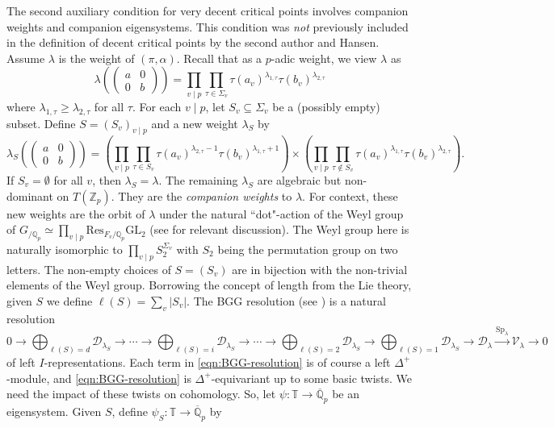 \documentclass[10pt, twoside]{amsart}
\theoremstyle{plain}
\theoremstyle{definition}
\theoremstyle{remark}
\numberwithin{equation}{subsection}
\def\Q{\mathbb Q}
\def\Z{\mathbb Z}
\def\T{\mathbb{T}}
\def\GL{\mathrm{GL}}
\def\Sp{\mathrm{Sp}}
\def\scrd{\mathscr D}
\def\scrv{\mathscr V}
\def\qpbar{\overline{\mathbb Q}_p}
\newcommand{\mat}[4]{\begin{pmatrix}#1&#2\\#3&#4\end{pmatrix}}
\begin{document}
The second auxiliary condition for very decent critical points involves companion weights and companion eigensystems. This condition was {\em not} previously included in the definition of decent { critical points} by the second author and Hansen. Assume $\lambda$ is the weight of $(\pi,\alpha)$. Recall that as a $p$-adic weight, we view $\lambda$ as
$$
\lambda\left(\mat a00b\right) = \prod_{v \mid p} \prod_{\tau \in \Sigma_v} \tau(a_v)^{\lambda_{1,\tau}}\tau(b_v)^{\lambda_{2,\tau}}
$$
where $\lambda_{1,\tau} \geq \lambda_{2,\tau}$ for all $\tau$. For each $v \mid p$, let $S_v \subseteq \Sigma_v$ be a (possibly empty) subset. Define $S = (S_v)_{v \mid p}$ and a new weight $\lambda_S$ by
$$
\lambda_S\left(\begin{pmatrix} a & 0 \\ 0 & b \end{pmatrix}\right) = \left(\prod_{v \mid p}\prod_{\tau \in S_v} \tau(a_v)^{\lambda_{2,\tau}-1}\tau(b_v)^{\lambda_{1,\tau}+1} \right) \times \left(\prod_{v \mid p}\prod_{\tau \not\in S_v}  \tau(a_v)^{\lambda_{1,\tau}}\tau(b_v)^{\lambda_{2,\tau}} \right).
$$
If $S_v = \emptyset$ for all $v$, then $\lambda_S = \lambda$.  The remaining $\lambda_S$ are algebraic but non-dominant on $T(\Z_p)$. 
{ They are the {\em companion weights} to $\lambda$. 
For context, these new weights are the orbit of $\lambda$ under the natural ``dot"-action of the Weyl group of $G_{/\Q_p}\simeq\prod_{v\mid p}\mathrm{Res}_{F_v/\Q_p} \GL_2$ (see \cite[Section 3.2.9]{Urban} 
for relevant discussion). The Weyl group here is naturally isomorphic to $\prod_{v\mid p}S_2^{\Sigma_v}$ with $S_2$ being the permutation group on two letters. The
non-empty choices of $S=(S_v)$ are in bijection with the non-trivial elements of the Weyl group. Borrowing the
concept of length from the Lie theory, given $S$ we define
 $\ell(S) = \sum_v |S_v|$.} The BGG resolution { (see \cite[Theorem 3.3.10]{Urban})} is a natural resolution
\begin{equation}\label{eqn:BGG-resolution}
0 \longrightarrow \bigoplus_{\ell(S) = d} \scrd_{\lambda_S} \longrightarrow \dotsb \longrightarrow \bigoplus_{\ell(S) = i} \scrd_{\lambda_S} \longrightarrow \dotsb \longrightarrow \bigoplus_{\ell(S) = 2} \scrd_{\lambda_S} \longrightarrow \bigoplus_{\ell(S) = 1} \scrd_{\lambda_S} \longrightarrow \scrd_\lambda \overset{\Sp_\lambda}\longrightarrow \scrv_\lambda \longrightarrow 0
\end{equation}
of left $I$-representations. Each term in \eqref{eqn:BGG-resolution} is of course a left $\Delta^+$-module, and \eqref{eqn:BGG-resolution} is $\Delta^+$-equivariant up to some basic twists. We need the impact of these twists on cohomology. So, let $\psi : \T \rightarrow \qpbar$ be an eigensystem. Given $S$, define $\psi_S : \T \rightarrow \qpbar$ by
\end{document}
